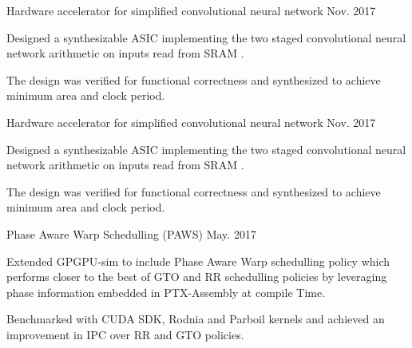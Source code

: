 \begin{cvprojects}
    \par\addvspace{0ex}
    \begin{flushleft}
    \par\addvspace{-1.5mm}
    \fontsize{10.4pt}{1em}\selectfont{}
    \end{flushleft}
    \par\addvspace{0.3ex}
    \cvproject
    {Hardware accelerator for simplified convolutional neural network }
    {\color{darkgray}Nov. 2017}
    {
      \begin{cvprojectitems}
        \item {Designed a synthesizable ASIC implementing the two staged convolutional neural network arithmetic on inputs read from SRAM . }
        \item {The design was verified for functional correctness and synthesized to achieve minimum area and clock period.} 
      \end{cvprojectitems}
    }

    \cvproject
    {Hardware accelerator for simplified convolutional neural network }
    {\color{darkgray}Nov. 2017}
    {
      \begin{cvprojectitems}
        \item {Designed a synthesizable ASIC implementing the two staged convolutional neural network arithmetic on inputs read from SRAM . }
        \item {The design was verified for functional correctness and synthesized to achieve minimum area and clock period.} 
      \end{cvprojectitems}
    }

    \par\addvspace{1ex}
    \begin{flushleft}
    \par\addvspace{-1.5mm}
    \fontsize{10.4pt}{1em}\selectfont{}
    \end{flushleft}
    \par\addvspace{0.3ex}
    \cvproject
    {Phase Aware Warp Schedulling (PAWS) }
    {\color{darkgray}May. 2017}
    {
      \begin{cvprojectitems}
        \item {Extended GPGPU-sim to include Phase Aware Warp schedulling policy which performs closer to the best of GTO and RR schedulling policies by leveraging phase information embedded in PTX-Assembly at compile Time.}
        \item {Benchmarked with CUDA SDK, Rodnia and Parboil kernels and achieved an improvement in IPC over RR and GTO policies.} 
      \end{cvprojectitems}
    }


\end{cvprojects}

